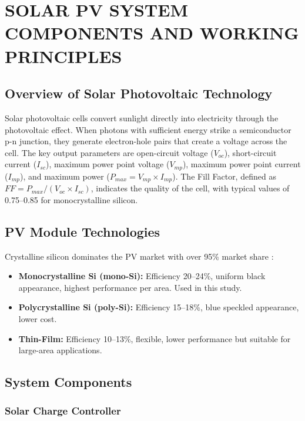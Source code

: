 \chapter{SOLAR PV SYSTEM COMPONENTS AND WORKING PRINCIPLES}

\section{Overview of Solar Photovoltaic Technology}

Solar photovoltaic cells convert sunlight directly into electricity through the photovoltaic effect. When photons with sufficient energy strike a semiconductor p-n junction, they generate electron-hole pairs that create a voltage across the cell. The key output parameters are open-circuit voltage ($V_{oc}$), short-circuit current ($I_{sc}$), maximum power point voltage ($V_{mp}$), maximum power point current ($I_{mp}$), and maximum power ($P_{max} = V_{mp} \times I_{mp}$). The Fill Factor, defined as $FF = P_{max}/(V_{oc} \times I_{sc})$, indicates the quality of the cell, with typical values of 0.75--0.85 for monocrystalline silicon.


\section{PV Module Technologies}

Crystalline silicon dominates the PV market with over 95\% market share \cite{fraunhofer2024}:

\begin{itemize}
    \item \textbf{Monocrystalline Si (mono-Si):} Efficiency 20--24\%, uniform black appearance, highest performance per area. Used in this study.
    \item \textbf{Polycrystalline Si (poly-Si):} Efficiency 15--18\%, blue speckled appearance, lower cost.
    \item \textbf{Thin-Film:} Efficiency 10--13\%, flexible, lower performance but suitable for large-area applications.
\end{itemize}


\section{System Components}

\subsection{Solar Charge Controller}

